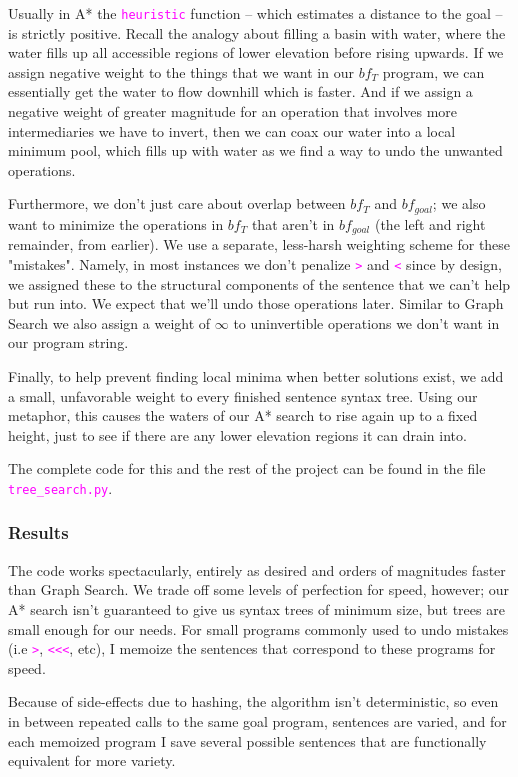 \documentclass[runningheads]{llncs}
\newcommand{\code}[1]{\texttt{\textcolor{magenta}{\setlength{\fboxsep}{1pt}\colorbox{lightgray!20}{#1}}}}
\begin{document}
Usually in A* the \code{heuristic} function -- which estimates a distance to the goal -- is strictly positive. Recall the analogy about filling a basin with water, where the water fills up all accessible regions of lower elevation before rising upwards. If we assign negative weight to the things that we want in our $bf_{T}$ program, we can essentially get the water to flow downhill which is faster. And if we assign a negative weight of greater magnitude for an operation that involves more intermediaries we have to invert, then we can coax our water into a local minimum pool, which fills up with water as we find a way to undo the unwanted operations.

Furthermore, we don't just care about overlap between $bf_{T}$ and $bf_{goal}$; we also want to minimize the operations in $bf_{T}$ that aren't in $bf_{goal}$ (the left and right remainder, from earlier). We use a separate, less-harsh weighting scheme for these "mistakes". Namely, in most instances we don't penalize \code{>} and \code{<} since by design, we assigned these to the structural components of the sentence that we can't help but run into. We expect that we'll undo those operations later. Similar to Graph Search we also assign a weight of $\infty$ to uninvertible operations we don't want in our program string.

Finally, to help prevent finding local minima when better solutions exist, we add a small, unfavorable weight to every finished sentence syntax tree. Using our metaphor, this causes the waters of our A* search to rise again up to a fixed height, just to see if there are any lower elevation regions it can drain into.

The complete code for this and the rest of the project can be found in the file \code{tree\_search.py}.

\subsubsection*{Results}
The code works spectacularly, entirely as desired and orders of magnitudes faster than Graph Search. We trade off some levels of perfection for speed, however; our A* search isn't guaranteed to give us syntax trees of minimum size, but trees are small enough for our needs. For small programs commonly used to undo mistakes (i.e \code{>}, \code{<<<}, etc), I memoize the sentences that correspond to these programs for speed.

Because of side-effects due to hashing, the algorithm isn't deterministic, so even in between repeated calls to the same goal program, sentences are varied, and for each memoized program I save several possible sentences that are functionally equivalent for more variety.
\end{document}
